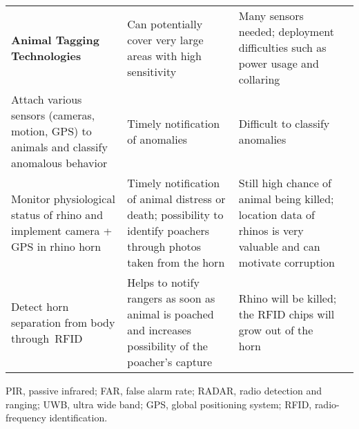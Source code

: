 \begin{table}[htbp]
{\begin{tabular}{p{18.335em}p{19.28em}p{22.28em}p{10.055em}}
{\textbf{Animal Tagging Technologies}} & Can potentially cover very large areas with high sensitivity & Many sensors needed; deployment difficulties such as power usage and collaring &  \\
       Attach various sensors (cameras, motion, GPS) to animals and classify anomalous behavior & Timely notification of anomalies & Difficult to classify anomalies & \citep{Sahin2007,FirmatBanzi2014,Recio2011} \\
       Monitor physiological status of rhino and implement camera + GPS in rhino horn & Timely notification of animal distress or death; possibility to identify poachers through photos taken from the horn & Still high chance of animal being killed; location data of rhinos is very valuable and can motivate corruption & \citep{o2016real,ProjectRAPID} \\
       Detect horn separation from body through~RFID & Helps to notify rangers as soon as animal is poached and increases possibility of the poacher's capture & Rhino will be killed; the RFID chips will grow out of the horn & \citep{intel_rhino_chip} \\ 
\bottomrule
\end{tabular} 
}

\medskip
	
\footnotesize PIR, passive infrared; FAR, false alarm rate; RADAR, radio detection and ranging; UWB, ultra wide band; GPS, global positioning system; RFID, radio-frequency identification.

	
\end{table}%